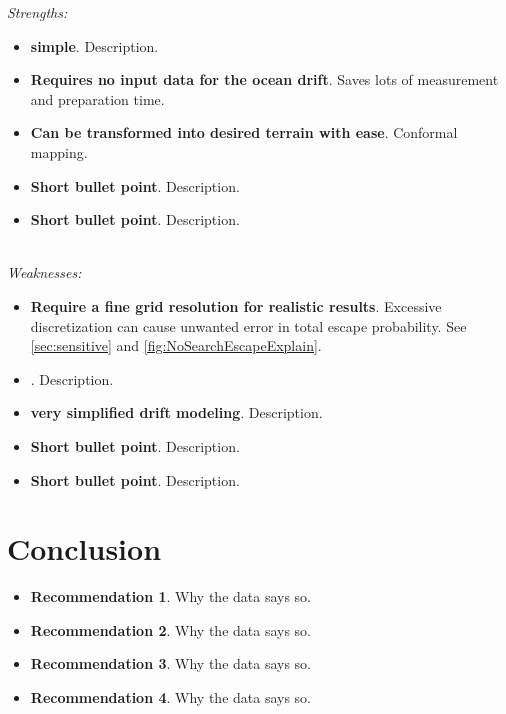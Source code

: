 \documentclass[12pt, letterpaper]{article}  %
\theoremstyle{definition}
\theoremstyle{remark}
\theoremstyle{plain}
\begin{document}
\textit{Strengths:}
\begin{itemize}
\item \textbf{simple}.  Description.
\item \textbf{Requires no input data for the ocean drift}. Saves lots of measurement and preparation time.
\item \textbf{Can be transformed into desired terrain with ease}.  Conformal mapping.
\item \textbf{Short bullet point}.  Description.
\item \textbf{Short bullet point}.  Description.
\end{itemize}
\ \\
\noindent \textit{Weaknesses:}
\begin{itemize}
\item \textbf{Require a fine grid resolution for realistic results}. Excessive discretization can cause unwanted error in total escape probability. See \ref{sec:sensitive} and \ref{fig:NoSearchEscapeExplain}.
\item \textbf{}.  Description.
\item \textbf{very simplified drift modeling}.  Description.
\item \textbf{Short bullet point}.  Description.
\item \textbf{Short bullet point}.  Description.
\end{itemize}








\section{Conclusion}\label{sec:conclusion}



\begin{itemize}
\item \textbf{Recommendation 1}.  Why the data says so.
\item \textbf{Recommendation 2}.  Why the data says so.
\item \textbf{Recommendation 3}.  Why the data says so.
\item \textbf{Recommendation 4}.  Why the data says so.
\end{itemize}
\end{document}
